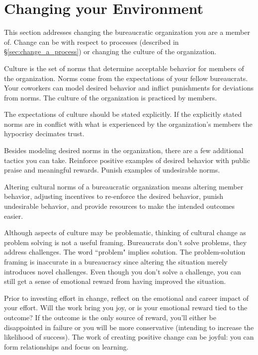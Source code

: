 \section{Changing your Environment}

This section addresses changing the bureaucratic organization you are a member of. Change can be with respect to processes (described in \S\ref{sec:change_a_process}) or changing the \gls{culture} of the organization.

Culture is the set of norms that determine acceptable behavior for members of the organization. Norms come from the expectations of your fellow bureaucrats. Your coworkers can model desired behavior and inflict punishments for deviations from norms. The culture of the organization is practiced by members. 

The expectations of culture should be stated explicitly. If the explicitly stated norms are in conflict with what is experienced by the organization's members the hypocrisy decimates trust. 

Besides modeling desired norms in the organization, there are a few additional tactics you can take. 
Reinforce positive examples of desired behavior with public praise and meaningful rewards. Punish examples of undesirable norms. 

Altering cultural norms of a bureaucratic organization means altering member behavior, adjusting incentives to re-enforce the desired behavior, punish undesirable behavior, and provide resources to make the intended outcomes easier. 

Although aspects of culture may be problematic, thinking of cultural change as problem solving is not a useful framing. Bureaucrats don't solve problems, they address challenges. The word ``problem" implies solution. The problem-solution framing is inaccurate in a bureaucracy since altering the situation merely introduces novel challenges. 
Even though you don't solve a challenge, you can still get a sense of emotional reward from having improved the situation. 

Prior to investing effort in change, reflect on the emotional and career impact of your effort. Will the work bring you joy, or is your emotional reward tied to the outcome? If the outcome is the only source of reward, you'll either be disappointed in failure or you will be more conservative (intending to increase the likelihood of success). The work of creating positive change can be joyful: you can form relationships and focus on learning. 

